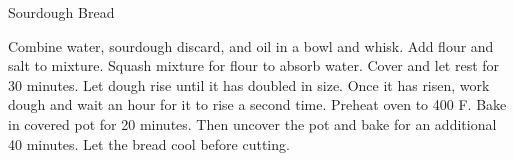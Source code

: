 \documentclass[../cookbook.tex]{subfiles}
\begin{document}
\begin{recipe}{Sourdough Bread}{}{}

    Combine water, sourdough discard, and oil in a bowl and whisk.
    Add flour and salt to mixture. Squash mixture for flour to
    absorb water. Cover and let rest for 30 minutes. Let dough
    rise until it has doubled in size. Once it has risen, work
    dough and wait an hour for it to rise a second time. Preheat
    oven to 400\degrees{} F. Bake in covered pot for 20 minutes.
    Then uncover the pot and bake for an additional 40 minutes.
    Let the bread cool before cutting.
\end{recipe}
\end{document}
